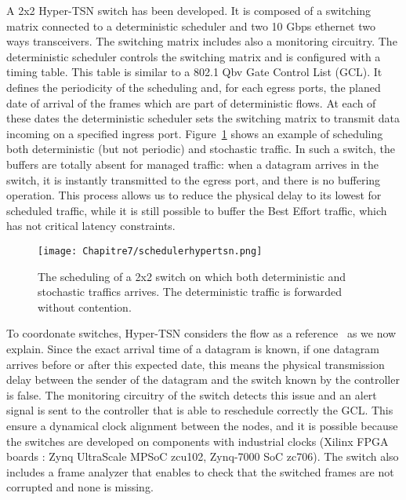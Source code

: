 A 2x2 Hyper-TSN switch has been developed. It is composed of a switching matrix connected to a deterministic scheduler and two 10 Gbps ethernet two ways transceivers. The switching matrix includes also a monitoring circuitry. The deterministic scheduler controls the switching matrix and is configured with a timing table. This table is similar to a 802.1 Qbv Gate Control List (GCL). It defines the periodicity of the scheduling and, for each egress ports, the planed date of arrival of the frames which are part of deterministic flows. At each of these dates the deterministic scheduler sets the switching matrix to transmit data incoming on a specified ingress port. Figure~\ref{fig:schedulehtsn} shows an example of scheduling both deterministic (but not periodic) and stochastic traffic.
 In such a switch, the buffers are totally absent for managed traffic: when a datagram arrives in the switch, it is instantly transmitted to the egress port, and there is no buffering operation. This process allows us to reduce the physical delay to its lowest for scheduled traffic, while it is still possible to buffer the Best Effort traffic, which has not critical latency constraints.
\begin{center}

\begin{figure}[h]
  \centering
\texttt{[image: Chapitre7/schedulerhypertsn.png]}
\caption{ The scheduling of a 2x2 switch on which both deterministic and stochastic traffics arrives. The deterministic traffic is forwarded without contention.}
\label{fig:schedulehtsn}
\end{figure}
\end{center}

To coordonate switches, Hyper-TSN considers the flow as a reference~\cite{leclerc2020optical} as we now explain. Since the exact arrival time of a datagram is known, if one datagram arrives before or after this expected date, this means the physical transmission delay between the sender of the datagram and the switch known by the controller is false. The monitoring circuitry of the switch detects this issue and an alert signal is sent to the controller that is able to reschedule correctly the GCL.
This ensure a dynamical clock alignment between the nodes, and it is possible because the switches are developed on components with industrial clocks (Xilinx FPGA boards : Zynq UltraScale MPSoC zcu102, Zynq-7000 SoC zc706). 
The switch also includes a frame analyzer that enables to check that the switched frames are not corrupted and none is missing.

